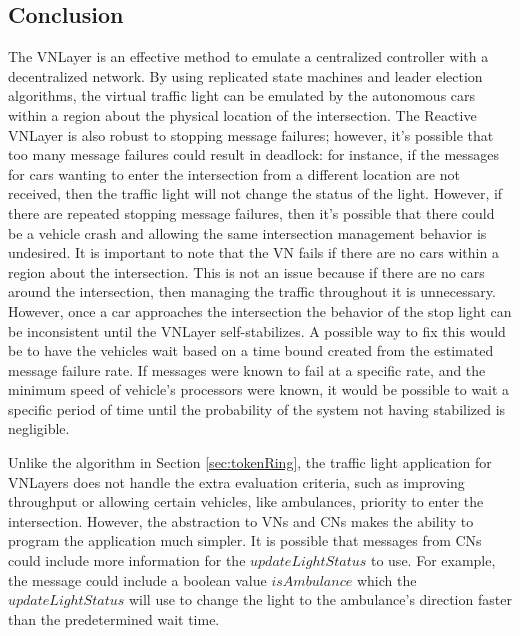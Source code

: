 \documentclass[12pt]{article}
\begin{document}
\subsection{Conclusion}
The VNLayer is an effective method to emulate a centralized controller with a decentralized network.  By using replicated state machines and leader election algorithms, the virtual traffic light can be emulated by the autonomous cars within a region about the physical location of the intersection.  The Reactive VNLayer is also robust to stopping message failures; however, it's possible that too many message failures could result in deadlock: for instance, if the messages for cars wanting to enter the intersection from a different location are not received, then the traffic light will not change the status of the light. However, if there are repeated stopping message failures, then it's possible that there could be a vehicle crash and allowing the same intersection management behavior is undesired.  
It is important to note that the VN fails if there are no cars within a region about the intersection. This is not an issue because if there are no cars around the intersection, then managing the traffic throughout it is unnecessary.  However, once a car approaches the intersection the behavior of the stop light can be inconsistent until the VNLayer self-stabilizes. A possible way to fix this would be to have the vehicles wait based on a time bound created from the estimated message failure rate. If messages were known to fail at a specific rate, and the minimum speed of vehicle's processors were known, it would be possible to wait a specific period of time until the probability of the system not having stabilized is negligible.

Unlike the algorithm in Section \ref{sec:tokenRing}, the traffic light application for VNLayers does not handle the extra evaluation criteria, such as improving throughput or allowing certain vehicles, like ambulances, priority to enter the intersection.  However, the abstraction to VNs and CNs makes the ability to program the application much simpler.  It is possible that messages from CNs could include more information for the $updateLightStatus$ to use.  For example, the message could include a boolean value $isAmbulance$ which the $updateLightStatus$ will use to change the light to the ambulance's direction faster than the predetermined wait time. 
\end{document}
